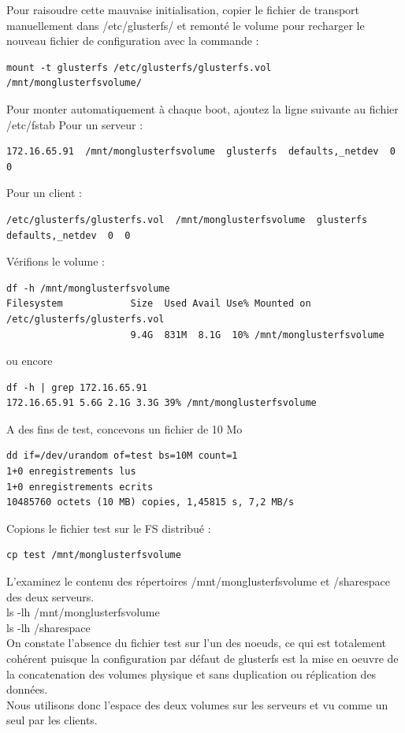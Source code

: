 \documentclass[12pt]{report}
\begin{document}
Pour raisoudre cette mauvaise initialisation, copier le fichier de transport manuellement dans /etc/glusterfs/ et remonté le volume pour recharger le nouveau fichier de configuration avec la commande :
\begin{lstlisting}
mount -t glusterfs /etc/glusterfs/glusterfs.vol /mnt/monglusterfsvolume/
	  \end{lstlisting}
Pour monter automatiquement à chaque boot, ajoutez la ligne suivante au fichier /etc/fstab
Pour un serveur :
\begin{lstlisting}
172.16.65.91  /mnt/monglusterfsvolume  glusterfs  defaults,_netdev  0  0
	  \end{lstlisting}
Pour un client :
\begin{lstlisting}
/etc/glusterfs/glusterfs.vol  /mnt/monglusterfsvolume  glusterfs  defaults,_netdev  0  0
	  \end{lstlisting}
Vérifions le volume :
\begin{lstlisting}
df -h /mnt/monglusterfsvolume
Filesystem            Size  Used Avail Use% Mounted on
/etc/glusterfs/glusterfs.vol
                      9.4G  831M  8.1G  10% /mnt/monglusterfsvolume
	  \end{lstlisting}
ou encore
\begin{lstlisting}
df -h | grep 172.16.65.91
172.16.65.91 5.6G 2.1G 3.3G 39% /mnt/monglusterfsvolume
	  \end{lstlisting}
A des fins de test, concevons un fichier de 10 Mo
\begin{lstlisting}
dd if=/dev/urandom of=test bs=10M count=1
1+0 enregistrements lus
1+0 enregistrements ecrits
10485760 octets (10 MB) copies, 1,45815 s, 7,2 MB/s
	  \end{lstlisting}
Copions le fichier test sur le FS distribué :
\begin{lstlisting}
cp test /mnt/monglusterfsvolume
	  \end{lstlisting}
L'examinez le contenu des répertoires /mnt/monglusterfsvolume et /sharespace des deux serveurs.\\
ls -lh /mnt/monglusterfsvolume\\
ls -lh /sharespace\\
On constate l'absence du fichier test sur l'un des noeuds, ce qui est totalement cohérent puisque la configuration par défaut de glusterfs est la mise en oeuvre de la concatenation des volumes physique et sans duplication ou réplication des données.\\
Nous utilisons donc l'espace des deux volumes sur les serveurs et vu comme un seul par les clients.
\end{document}
